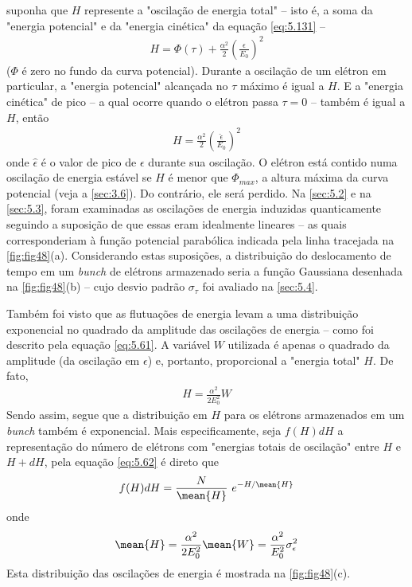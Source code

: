 suponha que $H$ represente a "oscilação de energia total" -- isto é, a soma da "energia potencial" e da "energia cinética" da equação \eqref{eq:5.131} --
\begin{align}
	H = \Phi(\tau) + \frac{\alpha^2}{2}\left(\frac{\epsilon}{E_0}\right)^2
\end{align}
($\Phi$ é zero no fundo da curva potencial). Durante a oscilação de um elétron em particular, a "energia potencial" alcançada no $\tau$ máximo é igual a $H$. E a "energia cinética" de pico -- a qual ocorre quando o elétron passa $\tau=0$ -- também é igual a $H$, então
\begin{align}
	H = \frac{\alpha^2}{2}\left(\frac{\hat{\epsilon}}{E_0}\right)^2
\end{align}
onde $\hat{\epsilon}$ é o valor de pico de $\epsilon$ durante sua oscilação. O elétron está contido numa oscilação de energia estável se $H$ é menor que $\Phi_{max}$, a altura máxima da curva potencial (veja a \autoref{sec:3.6}). Do contrário, ele será perdido.
 Na \autoref{sec:5.2} e na \autoref{sec:5.3}, foram examinadas as oscilações de energia induzidas quanticamente seguindo a suposição de que essas eram idealmente lineares -- as quais corresponderiam à função potencial parabólica indicada pela linha tracejada na \autoref{fig:fig48}(a). Considerando estas suposições, a distribuição do deslocamento de tempo em um \textit{bunch} de elétrons armazenado seria a função Gaussiana desenhada na \autoref{fig:fig48}(b) -- cujo desvio padrão $\sigma_\tau$ foi avaliado na \autoref{sec:5.4}.
 
Também foi visto que as flutuações de energia levam a uma distribuição exponencial no quadrado da amplitude das oscilações de energia -- como foi descrito pela equação \eqref{eq:5.61}. A variável $W$ utilizada é apenas o quadrado da amplitude (da oscilação em $\epsilon$) e, portanto, proporcional a "energia total" $H$. De fato,
\begin{align}
	H = \frac{\alpha^2}{2E_0^2}W
\end{align}
Sendo assim, segue que a distribuição em $H$ para os elétrons armazenados em um \textit{bunch} também é exponencial. Mais especificamente, seja $f(H)dH$ a representação do número de elétrons com "energias totais de oscilação" entre $H$ e $H+dH$, pela equação \eqref{eq:5.62} é direto que
\begin{align}
	f(H)dH = \frac{N}{\mean{H}}\ e^{-H/\mean{H}}
\end{align}
onde
\begin{align}
	\mean{H} = \frac{\alpha^2}{2E_0^2}\mean{W} = \frac{\alpha^2}{E_0^2}\sigma_\epsilon^2
\end{align}
Esta distribuição das oscilações de energia é mostrada na \autoref{fig:fig48}(c).

